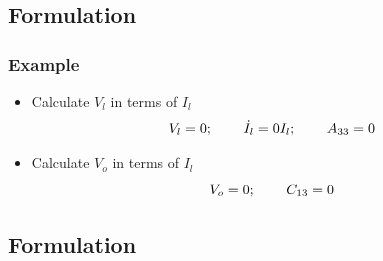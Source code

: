 \documentclass{beamer}
\begin{document}
\subsection*{Formulation}

\begin{frame}
\frametitle{Example}
\begin{small}
\begin{itemize}
\item Calculate $V_{l}$ in terms of $I_l$\\
\begin{equation}
V_{l}=0;\hspace{.3in} \dot{I}_{l}=0I_l; \hspace{.3in} A_{33}=0
\end{equation}

\item Calculate $V_{o}$ in terms of $I_l$\\
\begin{equation}
V_o=0; \hspace{0.3in} C_{13}=0
\end{equation}
\end{itemize}
\end{small}
\end{frame}


\subsection*{Formulation}
\end{document}

